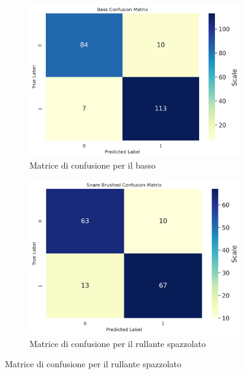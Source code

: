 \begin{figure}[h!]
	\centering
	\begin{subfigure}{.5\linewidth}
		\includegraphics[width=\linewidth]{./immagini/first_classification/cb_cm.png} 
		\caption{Matrice di confusione per il basso}
		\label{fig:cm_1a}
	\end{subfigure}\hfill
	\begin{subfigure}{.5\linewidth}
		\includegraphics[width=\linewidth]{./immagini/first_classification/sn_brushed_cm.png}
		\caption{Matrice di confusione per il rullante spazzolato}
		\label{fig:cm_1b}
	\end{subfigure}
	

\end{figure}

